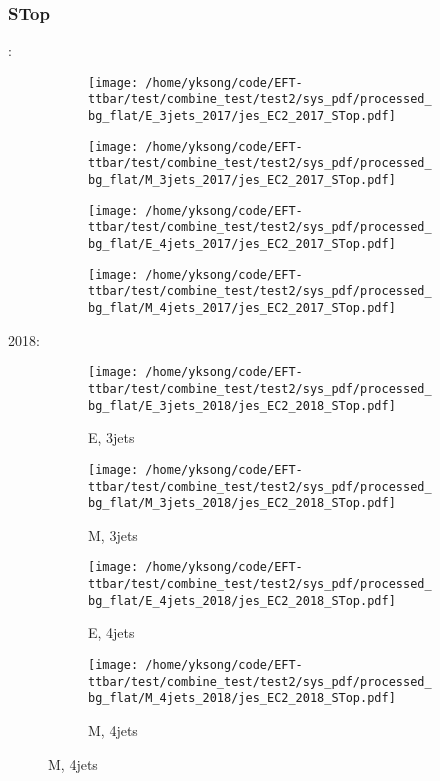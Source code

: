 \documentclass{beamer}
\begin{document}
\begin{frame}
\frametitle{STop}
\fontsize{5}{1}:
\begin{figure}
\centering
\begin{subfigure}[b]{0.24\textwidth}
\texttt{[image: /home/yksong/code/EFT-ttbar/test/combine\_test/test2/sys\_pdf/processed\_bg\_flat/E\_3jets\_2017/jes\_EC2\_2017\_STop.pdf]}
\end{subfigure}
\begin{subfigure}[b]{0.24\textwidth}
\texttt{[image: /home/yksong/code/EFT-ttbar/test/combine\_test/test2/sys\_pdf/processed\_bg\_flat/M\_3jets\_2017/jes\_EC2\_2017\_STop.pdf]}
\end{subfigure}
\begin{subfigure}[b]{0.24\textwidth}
\texttt{[image: /home/yksong/code/EFT-ttbar/test/combine\_test/test2/sys\_pdf/processed\_bg\_flat/E\_4jets\_2017/jes\_EC2\_2017\_STop.pdf]}
\end{subfigure}
\begin{subfigure}[b]{0.24\textwidth}
\texttt{[image: /home/yksong/code/EFT-ttbar/test/combine\_test/test2/sys\_pdf/processed\_bg\_flat/M\_4jets\_2017/jes\_EC2\_2017\_STop.pdf]}
\end{subfigure}
\end{figure}
2018:
\begin{figure}
\centering
\begin{subfigure}[b]{0.24\textwidth}
\texttt{[image: /home/yksong/code/EFT-ttbar/test/combine\_test/test2/sys\_pdf/processed\_bg\_flat/E\_3jets\_2018/jes\_EC2\_2018\_STop.pdf]}
\captionsetup{font=tiny}
\caption{E, 3jets}
\end{subfigure}
\begin{subfigure}[b]{0.24\textwidth}
\texttt{[image: /home/yksong/code/EFT-ttbar/test/combine\_test/test2/sys\_pdf/processed\_bg\_flat/M\_3jets\_2018/jes\_EC2\_2018\_STop.pdf]}
\captionsetup{font=tiny}
\caption{M, 3jets}
\end{subfigure}
\begin{subfigure}[b]{0.24\textwidth}
\texttt{[image: /home/yksong/code/EFT-ttbar/test/combine\_test/test2/sys\_pdf/processed\_bg\_flat/E\_4jets\_2018/jes\_EC2\_2018\_STop.pdf]}
\captionsetup{font=tiny}
\caption{E, 4jets}
\end{subfigure}
\begin{subfigure}[b]{0.24\textwidth}
\texttt{[image: /home/yksong/code/EFT-ttbar/test/combine\_test/test2/sys\_pdf/processed\_bg\_flat/M\_4jets\_2018/jes\_EC2\_2018\_STop.pdf]}
\captionsetup{font=tiny}
\caption{M, 4jets}
\end{subfigure}
\end{figure}
\end{frame}
\end{document}
